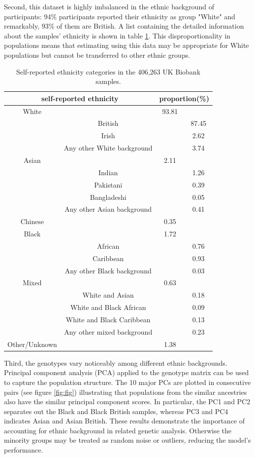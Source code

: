 \documentclass[a4paper,12pt]{article}
\begin{document}
Second, this dataset is highly imbalanced in the ethnic background of participants: 94\% participants reported their ethnicity as group "White" and remarkably, 93\% of them are British. A list containing the detailed information about the samples' ethnicity is shown in table \ref{ethnicity}. This disproportionality in populations means that estimating using this data may be appropriate for White populations but cannot be transferred to other ethnic groups.

\begin{table}[h]
	\centering
\begin{tabular} {c | c | c | c }
\multicolumn{2}{c}{self-reported ethnicity} & \multicolumn{2}{c}{proportion(\%)}  \\
\hline \hline
White & & 93.81 &   \\
 & British &  & 87.45  \\
 & Irish &  & 2.62  \\
 & Any other White background &  & 3.74  \\
 \hline
 Asian & & 2.11 & \\
 & Indian & & 1.26 \\
 & Pakistani & & 0.39 \\
 & Bangladeshi & & 0.05 \\
 & Any other Asian background & & 0.41 \\
 \hline
  Chinese & & 0.35 \\
  \hline
 Black & & 1.72 & \\
 & African & & 0.76 \\
 & Caribbean & & 0.93 \\
 & Any other Black background & & 0.03 \\
 \hline
 Mixed & & 0.63 & \\
 & White and Asian & & 0.18 \\
 & White and Black African  & & 0.09 \\
 & White and Black Caribbean & & 0.13 \\
 & Any other mixed background & & 0.23 \\
 \hline
Other/Unknown & & 1.38 &\\
\hline \hline
\end{tabular}	
\caption{Self-reported ethnicity categories in the 406,263 UK Biobank samples.}
\label{ethnicity}
\end{table}

Third, the genotypes vary noticeably among different ethnic backgrounds. Principal component analysis (PCA) applied to the genotype matrix can be used to capture the population structure. The 10 major PCs are plotted in consecutive pairs (see figure \ref{fig:fig}) illustrating that populations from the similar ancestries also have the similar principal component scores. In particular,  the PC1 and PC2 separates out the Black and Black British samples, whereas PC3 and PC4 indicates Asian and Asian British. These results demonstrate the importance of accounting for ethnic background in related genetic analysis. Otherwise the minority groups may be treated as random noise or outliers, reducing the model's performance.
\end{document}

